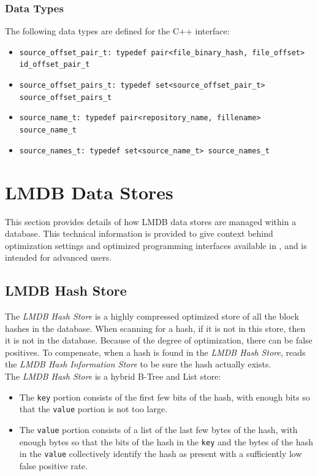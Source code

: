 \documentclass[11pt,fleqn]{article} %
\begin{document}
\subsubsection{Data Types}

The following data types are defined for the C++ interface:

\begin{itemize}
\item \verb+source_offset_pair_t: typedef pair<file_binary_hash, file_offset> id_offset_pair_t+
\item \verb+source_offset_pairs_t: typedef set<source_offset_pair_t> source_offset_pairs_t+
\item \verb+source_name_t: typedef pair<repository_name, fillename> source_name_t+
\item \verb+source_names_t: typedef set<source_name_t> source_names_t+
\end{itemize}

\section{LMDB Data Stores}
\label{LMDBDataStores}
This section provides details of how LMDB data stores are managed within a \hdb database. This technical information is provided to give context behind optimization settings and optimized programming interfaces available in \hdb, and is intended for advanced users.\\

\subsection{LMDB Hash Store}
The \textit{LMDB Hash Store} is a highly compressed optimized store of all the block hashes in the database.  When scanning for a hash, if it is not in this store, then it is not in the database.  Because of the degree of optimization, there can be false positives.  To compensate, when a hash is found in the \textit{LMDB Hash Store}, \hdb reads the \textit{LMDB Hash Information Store} to be sure the hash actually exists.\\

The \textit{LMDB Hash Store} is a hybrid B-Tree and List store:
\begin{itemize}
\item The \verb+key+ portion consists of the first few bits of the hash, with enough bits so that the \verb+value+ portion is not too large.
\item The \verb+value+ portion consists of a list of the last few bytes of the hash, with enough bytes so that the bits of the hash in the \verb+key+ and the bytes of the hash in the \verb+value+ collectively identify the hash as present with a sufficiently low false positive rate.
\end{itemize}
\end{document}
